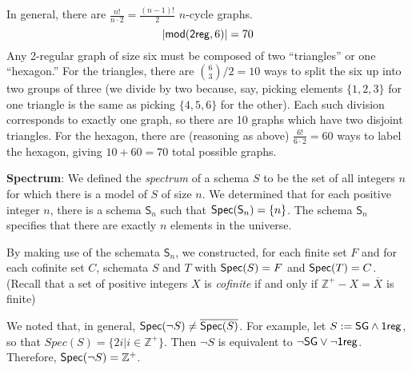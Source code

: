 \begin{mdframed}[linewidth=1]
In general, there are $\frac{n!}{n\cdot 2} = \frac{(n-1)!}{2}$ $n$-cycle graphs. 
\[
    |\mbox{$\mathsf{mod}(\mbox{$\mathsf{2reg}$},6)$}| = 70
\] 
Any 2-regular graph of size six must be composed of two ``triangles'' or one ``hexagon.'' For the triangles, there are $\binom{6}{3}/2 = 10$ ways to split the six up into two groups of three (we divide by two because, say, picking elements $\{1, 2, 3\}$ for one triangle is the same as picking $\{4, 5, 6\}$ for the other). Each such division corresponds to exactly one graph, so there are 10 graphs which have two disjoint triangles. For the hexagon, there are (reasoning as above) $\frac{6!}{6 \cdot 2} = 60$ ways to label the hexagon, giving $10 + 60 = 70$ total possible graphs. 

\textbf{Spectrum}: We defined the \emph{spectrum} of a schema $S$ to be the set of all integers $n$ for which there is a model of $S$ of size $n$. We determined that for each positive integer $n$, there is a schema $\mathsf{S}_n$ such that $\mbox{$\mathsf{Spec}(\mathsf{S}_n)$} = \{n\}$. The schema $\mathsf{S}_n$ specifies that there are exactly $n$ elements in the universe.

By making use of the schemata $\mathsf{S}_n$, we constructed, for each finite set $F$ and for each cofinite set $C$, schemata $S$ and $T$ with $\mbox{$\mathsf{Spec}(S)$}=F$ and $\mbox{$\mathsf{Spec}(T)$}=C$. (Recall that a set of positive integers $X$ is \emph{cofinite} if and only if $\mathbb{Z}^+ - X = \overline{X}$ is finite)



We noted that, in general, $\mbox{$\mathsf{Spec}(\lnot S)$} \neq \overline{\mbox{$\mathsf{Spec}(S)$}}$. For example, let $S := \mbox{$\mathsf{SG}$} \land \mbox{$\mathsf{1reg}$}$, so that $Spec(S) = \{2i | i \in \mathbb{Z}^+\}$. Then $\lnot S$ is equivalent to $\lnot \mbox{$\mathsf{SG}$} \vee \lnot \mbox{$\mathsf{1reg}$}$. Therefore, $\mbox{$\mathsf{Spec}(\lnot S)$} = \mathbb{Z}^+$. 


\end{mdframed}



